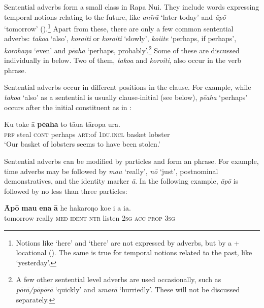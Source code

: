 Sentential adverbs form a small class in Rapa Nui. They include words expressing temporal notions relating to the future, like \textit{{\ꞌ}anīrā} ‘later today’ and \textit{āpō} ‘tomorrow’ ().\footnote{\label{fn:192}Notions like ‘here’ and ‘there’ are not expressed by adverbs, but by a  + locational (). The same is true for temporal notions related to the past, like ‘yesterday’.} Apart from these, there are only a few common sentential adverbs: \textit{tako{\ꞌ}a} ‘also’, \textit{\mbox{kora{\ꞌ}iti}} or \textit{\mbox{koro{\ꞌ}iti}} ‘slowly’, \textit{koi{\ꞌ}ite} ‘perhaps, if perhaps’, \textit{korohaŋa} ‘even’ and \textit{pēaha} ‘perhaps, probably’.\footnote{\label{fn:193}A few other sentential level adverbs are used occasionally, such as \textit{pōrā/pōpōrā} ‘quickly’ and \textit{umarā} ‘hurriedly’. These will not be discussed separately.} Some of these are discussed individually in  below. Two of them, \textit{\mbox{tako{\ꞌ}a}} and \textit{\mbox{koro{\ꞌ}iti}}, also occur in the verb phrase.

Sentential adverbs occur in different positions in the clause. For example, while \textit{tako{\ꞌ}a} ‘also’ as a sentential  is usually clause-initial (see  below), \textit{pēaha} ‘perhaps’ occurs after the initial constituent as in :

\ea\label{ex:4.127}
\gll Ku toke {\ꞌ}ā \textbf{pēaha} to tāua tāropa {\ꞌ}ura. \\
\textsc{prf} steal \textsc{cont} perhaps \textsc{art}:of \textsc{1du.incl} basket lobster \\

\glt
‘Our basket of lobsters seems to have been stolen.’ \textstyleExampleref{[Mtx-7-28.050]}
\z

Sentential adverbs can be modified by particles and form an  phrase. For example, time adverbs may be followed by \textit{mau} ‘really’, \textit{nō} ‘just’, postnominal demonstratives, and the identity marker \textit{{\ꞌ}ā}. In the following example, \textit{āpō} is followed by no less than three particles:

\ea\label{ex:4.128}
\gll \textbf{Āpō} \textbf{mau} \textbf{ena} \textbf{{\ꞌ}ā} he hakaroŋo koe i a ia.\\
tomorrow really \textsc{med} \textsc{ident} \textsc{ntr} listen \textsc{2sg} \textsc{acc} \textsc{prop} \textsc{3sg}\\

